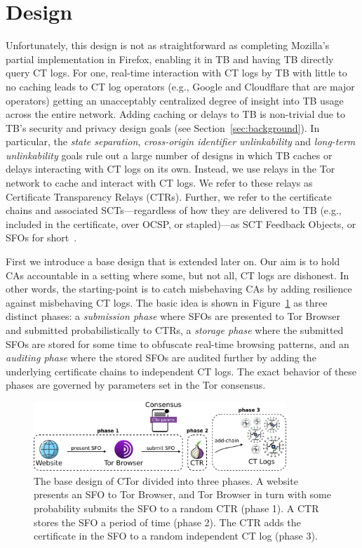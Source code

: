 \section{Design} \label{sec:base}
Unfortunately, this design is not as straightforward as completing Mozilla's
partial implementation in Firefox, enabling it in TB and having TB directly
query CT logs. For one, real-time interaction with CT logs by TB with little to
no caching leads to CT log operators (e.g., Google and Cloudflare that are major
operators) getting an unacceptably centralized degree of insight into TB usage
across the entire network. Adding caching or delays to TB is non-trivial due to
TB's security and privacy design goals (see Section~\ref{sec:background}). In
particular, the \emph{state separation},
\emph{cross-origin identifier unlinkability} and \emph{long-term unlinkability}
goals rule out a large number of designs in which TB caches or delays
interacting with CT logs on its own. Instead, we use relays in the Tor network
to cache and interact with CT logs. We refer to these relays as Certificate
Transparency Relays (CTRs). Further, we refer to the certificate chains and
associated SCTs---regardless of how they are delivered to TB (e.g., included in
the certificate, over OCSP, or stapled)---as SCT Feedback Objects, or SFOs for
short~\cite{nordberg}.

First we introduce a base design that is extended later on.  Our aim is to hold
CAs accountable in a setting where some, but not all, CT logs are dishonest.  In
other words, the starting-point is to catch misbehaving CAs by adding resilience
against misbehaving CT logs.  The basic idea is shown in
Figure~\ref{fig:design-ca} as three distinct phases: a \emph{submission phase}
where SFOs are presented to Tor Browser and submitted probabilistically to CTRs,
a \emph{storage phase} where the submitted SFOs are stored for some time to
obfuscate real-time browsing patterns, and an \emph{auditing phase} where the
stored SFOs are audited further by adding the underlying certificate chains to
independent CT logs. The exact behavior of these phases are governed by
parameters set in the Tor consensus.

\begin{figure}
	\centering
	\includegraphics[width=0.85\textwidth]{img/design-ca}
	\caption{%
		The base design of CTor divided into three phases. A website presents an
		SFO to Tor Browser, and Tor Browser in turn with some probability
		submits the SFO to a random CTR (phase 1). A CTR stores the SFO a period
		of time (phase 2). The CTR adds the certificate in the SFO to a random
		independent CT log (phase 3).
	}
	\label{fig:design-ca}
\end{figure}

